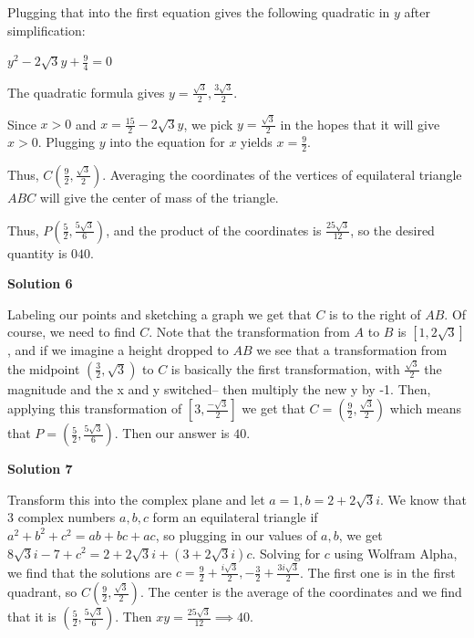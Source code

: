 \begin{enumerate}
 Plugging that into the first equation gives the following quadratic in $y$ after simplification:

 $y^2 - 2\sqrt{3}y + \frac{9}{4} = 0$

 The quadratic formula gives $y = \frac{\sqrt{3}}{2}, \frac{3\sqrt{3}}{2}$.  

 Since $x > 0$ and $x = \frac{15}{2} - 2\sqrt{3}y$, we pick $y = \frac{\sqrt{3}}{2}$ in the hopes that it will give $x > 0$.  Plugging $y$ into the equation for $x$ yields $x = \frac{9}{2}$.

 Thus, $C(\frac{9}{2}, \frac{\sqrt{3}}{2})$.  Averaging the coordinates of the vertices of equilateral triangle $ABC$ will give the center of mass of the triangle.  

 Thus, $P(\frac{5}{2}, \frac{5\sqrt{3}}{6})$, and the product of the coordinates is $\frac{25\sqrt{3}}{12}$, so the desired quantity is $\boxed{040}$. 

 



\textbf{Solution 6}

Labeling our points and sketching a graph we get that $C$ is to the right of $AB$. Of course, we need to find $C$. Note that the transformation from $A$ to $B$ is $[1,2\sqrt{3}]$, and if we imagine a height dropped to $AB$ we see that a transformation from the midpoint $(\frac{3}{2},\sqrt {3})$ to $C$ is basically the first transformation, with $\frac{\sqrt{3}}{2}$ the magnitude and the x and y switched– then multiply the new y by -1. Then, applying this transformation of $[3,\frac{-\sqrt{3}}{2}]$ we get that $C=(\frac{9}{2},\frac{\sqrt{3}}{2})$ which means that $P=(\frac{5}{2},\frac{5\sqrt{3}}{6})$. Then our answer is $\boxed{40}$.

 



\textbf{Solution 7}

Transform this into the complex plane and let $a=1, b=2+2\sqrt3 i$. We know that 3 complex numbers $a,b,c$ form an equilateral triangle if $a^2+b^2+c^2=ab+bc+ac$, so plugging in our values of $a,b$, we get $8\sqrt3 i - 7 +c^2 = 2+2\sqrt3 i + (3+2\sqrt 3i)c.$ Solving for $c$ using Wolfram Alpha, we find that the solutions are $c=\frac 92 + \frac{i\sqrt3}{2}, -\frac 32 + \frac{3i\sqrt3}{2}$. The first one is in the first quadrant, so $C\left( \frac 92, \frac{\sqrt3}{2} \right)$. The center is the average of the coordinates and we find that it is $\left(\frac{5}2, \frac{5\sqrt3}{6} \right)$. Then $xy = \frac{25\sqrt3}{12} \implies 40$.


\end{enumerate}
